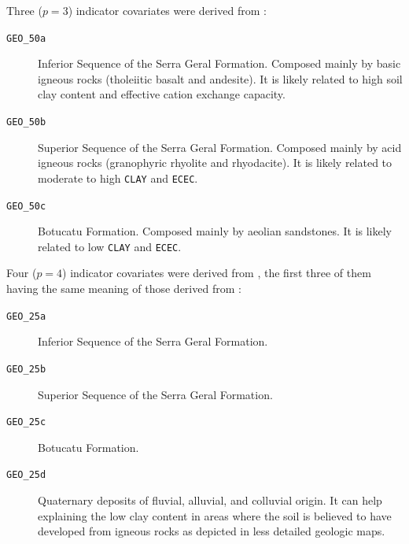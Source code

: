 
Three ($p = 3$) indicator covariates were derived from \geoOld{}:

\begin{description}
\item[\texttt{GEO\_50a}] Inferior Sequence of the Serra Geral Formation. Composed mainly by basic igneous 
rocks (tholeiitic basalt and andesite). It is likely related to high soil clay content and effective cation 
exchange capacity.
 
\item[\texttt{GEO\_50b}] Superior Sequence of the Serra Geral Formation. Composed mainly by acid igneous rocks 
(granophyric rhyolite and rhyodacite). It is likely related to moderate to high \texttt{CLAY} and 
\texttt{ECEC}.
 
\item[\texttt{GEO\_50c}] Botucatu Formation. Composed mainly by aeolian sandstones. It is likely related to 
low \texttt{CLAY} and \texttt{ECEC}.
\end{description}

Four ($p = 4$) indicator covariates were derived from \geoNew{}, the first three of them having the same 
meaning of those derived from \geoOld{}:

\begin{description}
\item[\texttt{GEO\_25a}] Inferior Sequence of the Serra Geral Formation.
 
\item[\texttt{GEO\_25b}] Superior Sequence of the Serra Geral Formation.
 
\item[\texttt{GEO\_25c}] Botucatu Formation.
 
\item[\texttt{GEO\_25d}] Quaternary deposits of fluvial, alluvial, and colluvial origin. It can help 
explaining the low clay content in areas where the soil is believed to have developed from igneous rocks as 
depicted in less detailed geologic maps.
\end{description}

